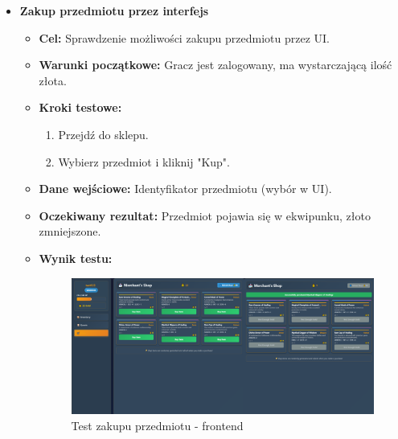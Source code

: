 \begin{itemize}
    \item \textbf{Zakup przedmiotu przez interfejs}
    \begin{itemize}
        \item \textbf{Cel:} Sprawdzenie możliwości zakupu przedmiotu przez UI.
        \item \textbf{Warunki początkowe:} Gracz jest zalogowany, ma wystarczającą ilość złota.
        \item \textbf{Kroki testowe:}
        \begin{enumerate}
            \item Przejdź do sklepu.
            \item Wybierz przedmiot i kliknij "Kup".
        \end{enumerate}
        \item \textbf{Dane wejściowe:} Identyfikator przedmiotu (wybór w UI).
        \item \textbf{Oczekiwany rezultat:} Przedmiot pojawia się w ekwipunku, złoto zmniejszone.
        \item \textbf{Wynik testu:}
        \begin{figure}[H]
            \includegraphics[width=480px]{figures/testy/test-buyitem-front.png}
            \caption{Test zakupu przedmiotu - frontend}
        \end{figure}
    \end{itemize}


\end{itemize}
